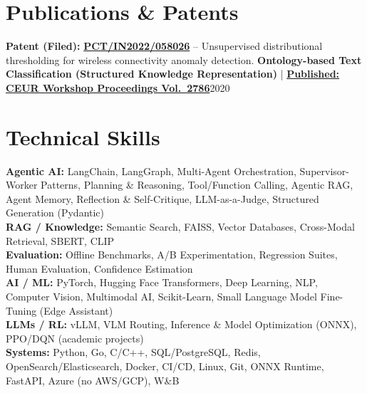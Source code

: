 \documentclass[letterpaper,11pt]{article}
\begin{document}

\resumeItemListEnd
\resumeSubHeadingListEnd

\section{Publications \& Patents}
\resumeSubHeadingListStart
\resumeProjectHeading
{\textbf{Patent (Filed):} \href{https://patents.justia.com/inventor/vedaang-chopra}{\textbf{PCT/IN2022/058026}} -- Unsupervised distributional thresholding for wireless
  connectivity anomaly detection.}{}
\resumeProjectHeading
{\textbf{Ontology-based Text Classification (Structured Knowledge Representation)} \;|\; \href{https://ceur-ws.org/Vol-2786/Paper16.pdf}{\textbf{Published: CEUR Workshop Proceedings Vol.\ 2786}}}{2020}
\resumeSubHeadingListEnd

\section{Technical Skills}
\footnotesize
\textbf{Agentic AI:} LangChain, LangGraph, Multi-Agent Orchestration, Supervisor-Worker Patterns,
  Planning \& Reasoning, Tool/Function Calling, Agentic RAG, Agent Memory, Reflection \& Self-Critique,
  LLM-as-a-Judge, Structured Generation (Pydantic) \\[1pt]
\textbf{RAG / Knowledge:} Semantic Search, FAISS, Vector Databases, Cross-Modal Retrieval, SBERT, CLIP \\[1pt]
\textbf{Evaluation:} Offline Benchmarks, A/B Experimentation, Regression Suites, Human Evaluation,
  Confidence Estimation \\[1pt]
\textbf{AI / ML:} PyTorch, Hugging Face Transformers, Deep Learning, NLP, Computer Vision, Multimodal AI,
  Scikit-Learn, Small Language Model Fine-Tuning (Edge Assistant) \\[1pt]
\textbf{LLMs / RL:} vLLM, VLM Routing, Inference \& Model Optimization (ONNX), PPO/DQN (academic projects) \\[1pt]
\textbf{Systems:} Python, Go, C/C++, SQL/PostgreSQL, Redis, OpenSearch/Elasticsearch, Docker, CI/CD,
  Linux, Git, ONNX Runtime, FastAPI, Azure (no AWS/GCP), W\&B
\end{document}
